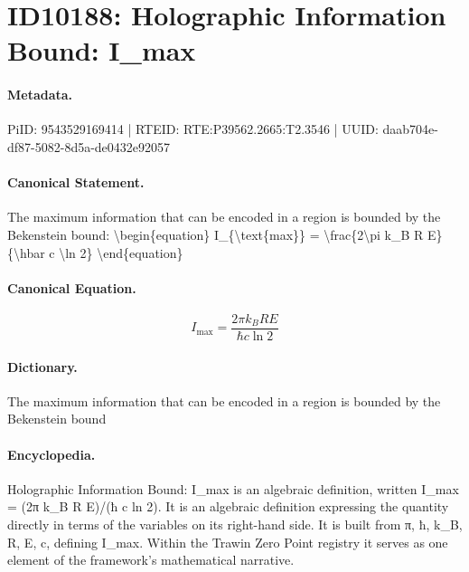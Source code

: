 \section*{ID10188: Holographic Information Bound: I\_max}
\paragraph{Metadata.}
PiID: 9543529169414 | RTEID: RTE:P39562.2665:T2.3546 | UUID: daab704e-df87-5082-8d5a-de0432e92057

\paragraph{Canonical Statement.}
The maximum information that can be encoded in a region is bounded by the Bekenstein bound: \textbackslash{}begin\{equation\} I\_\{\textbackslash{}text\{max\}\} = \textbackslash{}frac\{2\textbackslash{}pi k\_B R E\}\{\textbackslash{}hbar c \textbackslash{}ln 2\} \textbackslash{}end\{equation\}

\paragraph{Canonical Equation.}
\[
I_{\text{max}} = \frac{2\pi k_B R E}{\hbar c \ln 2}
\]

\paragraph{Dictionary.}
The maximum information that can be encoded in a region is bounded by the Bekenstein bound

\paragraph{Encyclopedia.}
Holographic Information Bound: I\_max is an algebraic definition, written I\_max = (2π k\_B R E)/(ħ c ln 2). It is an algebraic definition expressing the quantity directly in terms of the variables on its right-hand side. It is built from π, ħ, k\_B, R, E, c, defining I\_max. Within the Trawin Zero Point registry it serves as one element of the framework's mathematical narrative.
